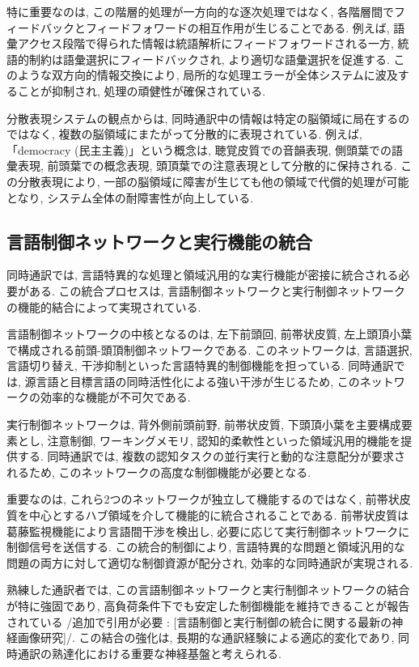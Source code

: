 特に重要なのは, この階層的処理が一方向的な逐次処理ではなく, 各階層間でフィードバックとフィードフォワードの相互作用が生じることである.
例えば, 語彙アクセス段階で得られた情報は統語解析にフィードフォワードされる一方, 統語的制約は語彙選択にフィードバックされ, より適切な語彙選択を促進する.
このような双方向的情報交換により, 局所的な処理エラーが全体システムに波及することが抑制され, 処理の頑健性が確保されている.

分散表現システムの観点からは, 同時通訳中の情報は特定の脳領域に局在するのではなく, 複数の脳領域にまたがって分散的に表現されている.
例えば, 「democracy (民主主義)」という概念は, 聴覚皮質での音韻表現, 側頭葉での語彙表現, 前頭葉での概念表現, 頭頂葉での注意表現として分散的に保持される.
この分散表現により, 一部の脳領域に障害が生じても他の領域で代償的処理が可能となり, システム全体の耐障害性が向上している.

\subsection{言語制御ネットワークと実行機能の統合}

同時通訳では, 言語特異的な処理と領域汎用的な実行機能が密接に統合される必要がある.
この統合プロセスは, 言語制御ネットワークと実行制御ネットワークの機能的結合によって実現されている.

言語制御ネットワークの中核となるのは, 左下前頭回, 前帯状皮質, 左上頭頂小葉で構成される前頭-頭頂制御ネットワークである.
このネットワークは, 言語選択, 言語切り替え, 干渉抑制といった言語特異的制御機能を担っている.
同時通訳では, 源言語と目標言語の同時活性化による強い干渉が生じるため, このネットワークの効率的な機能が不可欠である.

実行制御ネットワークは, 背外側前頭前野, 前帯状皮質, 下頭頂小葉を主要構成要素とし, 注意制御, ワーキングメモリ, 認知的柔軟性といった領域汎用的機能を提供する.
同時通訳では, 複数の認知タスクの並行実行と動的な注意配分が要求されるため, このネットワークの高度な制御機能が必要となる.

重要なのは, これら2つのネットワークが独立して機能するのではなく, 前帯状皮質を中心とするハブ領域を介して機能的に統合されることである.
前帯状皮質は葛藤監視機能により言語間干渉を検出し, 必要に応じて実行制御ネットワークに制御信号を送信する.
この統合的制御により, 言語特異的な問題と領域汎用的な問題の両方に対して適切な制御資源が配分され, 効率的な同時通訳が実現される.

熟練した通訳者では, この言語制御ネットワークと実行制御ネットワークの結合が特に強固であり, 高負荷条件下でも安定した制御機能を維持できることが報告されている {/追加で引用が必要 : [言語制御と実行制御の統合に関する最新の神経画像研究]/}.
この結合の強化は, 長期的な通訳経験による適応的変化であり, 同時通訳の熟達化における重要な神経基盤と考えられる.

